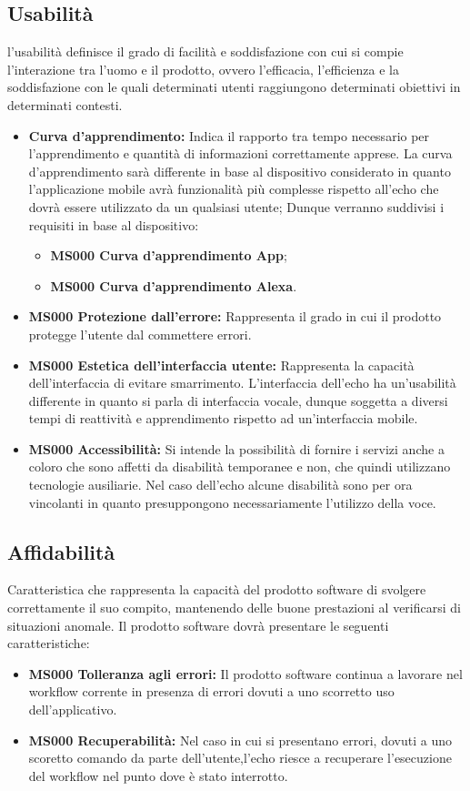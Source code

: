 \subsection{Usabilità}
l'usabilità definisce il grado di facilità e soddisfazione con cui si compie l'interazione tra l'uomo e il prodotto, ovvero l'efficacia, l'efficienza e la soddisfazione con le quali determinati utenti raggiungono determinati obiettivi in determinati contesti.
\begin{itemize}
	\item \textbf{Curva d'apprendimento:} Indica il rapporto tra tempo necessario per l'apprendimento e quantità di informazioni correttamente apprese.
	La curva d'apprendimento sarà differente in base al dispositivo considerato in quanto l'applicazione mobile avrà funzionalità più complesse rispetto all'echo che dovrà essere utilizzato da un qualsiasi utente;
	Dunque verranno suddivisi i requisiti in base al dispositivo:
	\begin{itemize}
		\item \textbf{MS000 Curva d'apprendimento App};
		\item \textbf{MS000 Curva d'apprendimento Alexa}.
	\end{itemize}
	\item \textbf{MS000 Protezione dall'errore:} Rappresenta il grado in cui il prodotto protegge l'utente dal commettere errori.
	\item \textbf{MS000 Estetica dell'interfaccia utente:} Rappresenta la capacità dell'interfaccia di evitare smarrimento.
	L'interfaccia dell'echo ha un'usabilità differente  in quanto si parla di interfaccia vocale, dunque soggetta a diversi tempi di reattività e apprendimento rispetto ad un'interfaccia mobile.
	\item \textbf{MS000 Accessibilità:}  Si intende la possibilità di fornire i servizi anche a coloro che sono affetti da disabilità temporanee e non, che quindi utilizzano tecnologie ausiliarie.
	Nel caso dell'echo alcune disabilità sono per ora vincolanti in quanto presuppongono necessariamente l'utilizzo della voce.
\end{itemize}
\subsection{Affidabilità}
Caratteristica che rappresenta la capacità del prodotto software di svolgere correttamente il suo compito, mantenendo delle buone prestazioni al verificarsi di situazioni anomale. 
Il prodotto software dovrà presentare le seguenti caratteristiche:
 \begin{itemize}
	\item \textbf{MS000 Tolleranza agli errori:} Il prodotto software continua a lavorare nel workflow corrente in presenza di errori dovuti a uno scorretto uso dell'applicativo.
	\item \textbf{MS000 Recuperabilità:} Nel caso in cui si presentano errori, dovuti a uno scoretto comando da parte dell'utente,l'echo riesce a recuperare l'esecuzione  del workflow nel punto dove è stato interrotto.
\end{itemize}
